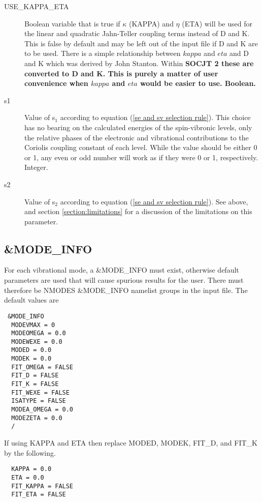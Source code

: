 \documentclass{article}
\newcommand{\socjttwo}{\bf{SOCJT 2 }}
\begin{document}
\begin{description}
  \item[USE\_KAPPA\_ETA] Boolean variable that is true if $\kappa$ (KAPPA) and 
  $\eta$ (ETA) will be used for the linear and quadratic Jahn-Teller coupling
  terms instead of D and K. This is false by default and may be left out of the
  input file if D and K are to be used. There is a simple relationship between
  $kappa$ and $eta$ and D and K which was derived by John Stanton. Within
  \socjttwo these are converted to D and K. This is purely a matter of user convenience
  when $kappa$ and $eta$ would be easier to use. Boolean.

\item[s1] Value of s$_1$ according to equation (\ref{se and sv
    selection rule}). This choice has no bearing on the calculated
  energies of the spin-vibronic levels, only the relative phases of
  the electronic and vibrational contributions to the Coriolis
  coupling constant of each level. While the value should be either 0
  or 1, any even or odd number will work as if they were 0 or 1,
  respectively. Integer. 

\item[s2] Value of s$_2$ according to equation (\ref{se and sv
    selection rule}). See above, and section \ref{section:limitations}
  for a discussion of the limitations on this parameter.

\end{description}

\subsection{\&MODE\_INFO}

For each vibrational mode, a \&MODE\_INFO must exist, otherwise
default parameters are used that will cause spurious results for the
user. There must therefore be NMODES \&MODE\_INFO namelist groups in
the input file. The default values are

\begin{verbatim}
 &MODE_INFO
  MODEVMAX = 0
  MODEOMEGA = 0.0
  MODEWEXE = 0.0
  MODED = 0.0
  MODEK = 0.0
  FIT_OMEGA = FALSE
  FIT_D = FALSE
  FIT_K = FALSE
  FIT_WEXE = FALSE
  ISATYPE = FALSE
  MODEA_OMEGA = 0.0
  MODEZETA = 0.0
  /
\end{verbatim}

If using KAPPA and ETA then replace MODED, MODEK, FIT\_D, and FIT\_K by the following.

\begin{verbatim}
  KAPPA = 0.0
  ETA = 0.0
  FIT_KAPPA = FALSE
  FIT_ETA = FALSE
\end{verbatim}
\end{document}
